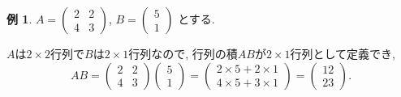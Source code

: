 \documentclass[dvipdfmx,a4paper,11pt]{article}
\theoremstyle{definition}
\newtheorem{exa}[thm]{例}
\begin{document}
  \begin{exa}
 $ A= 
 \begin{pmatrix}
2 & 2\\
4 & 3
 \end{pmatrix}
 $, $
 B = 
 \begin{pmatrix}
5 \\1
 \end{pmatrix}
 $
 とする. 
 
 $A$は$2\times 2$行列で$B$は$2 \times 1$行列なので, 行列の積$AB$が$2 \times 1$行列として定義でき, 
 $$
 AB = 
 \begin{pmatrix}
2 & 2\\
4 & 3
 \end{pmatrix}
  \begin{pmatrix}
5 \\1
 \end{pmatrix}
 =  
 \begin{pmatrix}
2\times 5 + 2\times 1 \\
4 \times 5 + 3 \times 1
 \end{pmatrix}
 = 
  \begin{pmatrix}
12 \\
23
 \end{pmatrix}.
 $$
 
 \end{exa}
 
\end{document}
